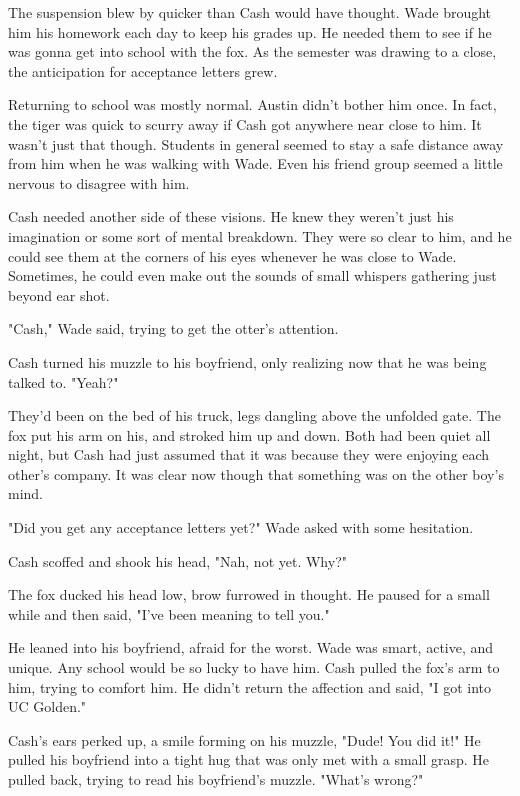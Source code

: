 \secdiv

The suspension blew by quicker than Cash would have thought. Wade brought him his homework each day to keep his grades up. He needed them to see if he was gonna get into school with the fox. As the semester was drawing to a close, the anticipation for acceptance letters grew.

Returning to school was mostly normal. Austin didn't bother him once. In fact, the tiger was quick to scurry away if Cash got anywhere near close to him. It wasn't just that though. Students in general seemed to stay a safe distance away from him when he was walking with Wade. Even his friend group seemed a little nervous to disagree with him.

Cash needed another side of these visions. He knew they weren't just his imagination or some sort of mental breakdown. They were so clear to him, and he could see them at the corners of his eyes whenever he was close to Wade. Sometimes, he could even make out the sounds of small whispers gathering just beyond ear shot.

"Cash," Wade said, trying to get the otter's attention.

Cash turned his muzzle to his boyfriend, only realizing now that he was being talked to. "Yeah?"

They'd been on the bed of his truck, legs dangling above the unfolded gate. The fox put his arm on his, and stroked him up and down. Both had been quiet all night, but Cash had just assumed that it was because they were enjoying each other's company. It was clear now though that something was on the other boy's mind.

"Did you get any acceptance letters yet?" Wade asked with some hesitation.

Cash scoffed and shook his head, "Nah, not yet. Why?"

The fox ducked his head low, brow furrowed in thought. He paused for a small while and then said, "I've been meaning to tell you."

He leaned into his boyfriend, afraid for the worst. Wade was smart, active, and unique. Any school would be so lucky to have him. Cash pulled the fox's arm to him, trying to comfort him. He didn't return the affection and said, "I got into UC Golden."

Cash's ears perked up, a smile forming on his muzzle, "Dude! You did it!" He pulled his boyfriend into a tight hug that was only met with a small grasp. He pulled back, trying to read his boyfriend's muzzle. "What's wrong?"

